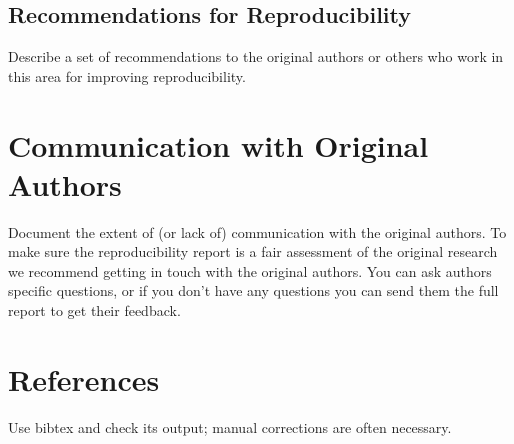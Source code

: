 \documentclass{article}
\begin{document}
\subsection{Recommendations for Reproducibility}

Describe a set of recommendations to the original authors or others who work in this area for improving reproducibility.

\section*{Communication with Original Authors}
Document the extent of (or lack of) communication with the original authors. To make sure the reproducibility report is a fair assessment of the original research we recommend getting in touch with the original authors. You can ask authors specific questions, or if you don't have any questions you can send them the full report to get their feedback.


\section*{References}

Use bibtex and check its output; manual corrections are often necessary.
\end{document}
